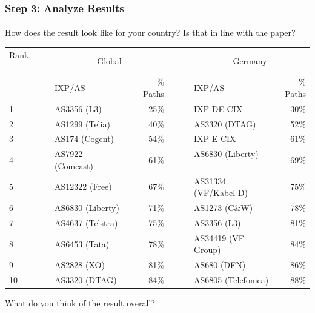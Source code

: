 \clearpage
\begin{frame}
\frametitle{Step 3: Analyze Results}
\framesubtitle{}

How does the result look like for your country? Is that in line with the paper?
\begin{table}[!h]%
	\centering		
	{\begin{tabular}{llrclr}
			\toprule
			Rank ~~~~~& \multicolumn{2}{c}{Global} && \multicolumn{2}{c}{Germany}	\\
			\cmidrule{2-3} \cmidrule{5-6}
			& IXP/AS  & \textSigma\% Paths &~~~& IXP/AS & \textSigma\% Paths   \\
			\midrule
			1 & AS3356 (L3)  & 25\%  && IXP DE-CIX & 30\% \\
			2 & AS1299 (Telia) & 40\%  && AS3320 (DTAG) & 52\% \\
			3 & AS174 (Cogent)  & 54\%  && IXP E-CIX & 61\% \\
			4 & AS7922 (Comcast)~~~  & 61\%  && AS6830 (Liberty) ~~~& 69\% \\
			5 & AS12322 (Free)  & 67\%  && AS31334 (VF/Kabel D) & 75\%\\
			6 & AS6830 (Liberty)  & 71\%  && AS1273 (C\&W)& 78\%\\
			7 & AS4637 (Telstra) & 75\%  && AS3356 (L3)  & 81\% \\
			8 & AS6453 (Tata) & 78\%  && AS34419 (VF Group)& 84\% \\
			9 & AS2828 (XO)  & 81\%  && AS680 (DFN) & 86\% \\
			10 & AS3320 (DTAG) & 84\% && AS6805 (Telefonica) & 88\% \\
			\bottomrule
	\end{tabular}}
\end{table}

\pause
What do you think of the result overall?
\end{frame}
\clearpage

